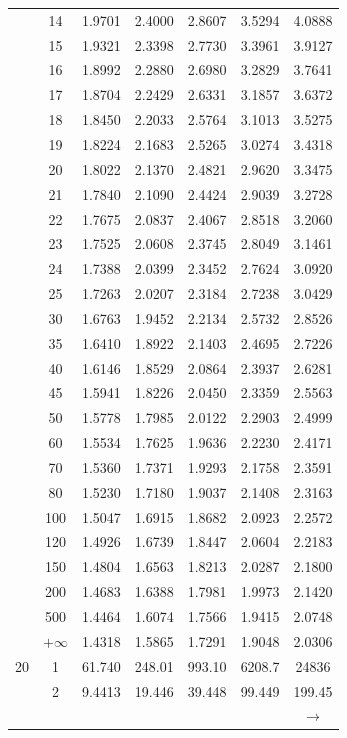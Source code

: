 \begin{minipage}{0.49\textwidth}
\begin{center}
\begin{tabular}{ccccccc}
			& 14 & 1.9701 & 2.4000 & 2.8607 & 3.5294 & 4.0888 \\
			& 15 & 1.9321 & 2.3398 & 2.7730 & 3.3961 & 3.9127 \\
			& 16 & 1.8992 & 2.2880 & 2.6980 & 3.2829 & 3.7641 \\
			& 17 & 1.8704 & 2.2429 & 2.6331 & 3.1857 & 3.6372 \\
			& 18 & 1.8450 & 2.2033 & 2.5764 & 3.1013 & 3.5275 \\
			& 19 & 1.8224 & 2.1683 & 2.5265 & 3.0274 & 3.4318 \\[5pt]
			& 20 & 1.8022 & 2.1370 & 2.4821 & 2.9620 & 3.3475 \\
			& 21 & 1.7840 & 2.1090 & 2.4424 & 2.9039 & 3.2728 \\
			& 22 & 1.7675 & 2.0837 & 2.4067 & 2.8518 & 3.2060 \\
			& 23 & 1.7525 & 2.0608 & 2.3745 & 2.8049 & 3.1461 \\
			& 24 & 1.7388 & 2.0399 & 2.3452 & 2.7624 & 3.0920 \\
			& 25 & 1.7263 & 2.0207 & 2.3184 & 2.7238 & 3.0429 \\
			& 30 & 1.6763 & 1.9452 & 2.2134 & 2.5732 & 2.8526 \\
			& 35 & 1.6410 & 1.8922 & 2.1403 & 2.4695 & 2.7226 \\
			& 40 & 1.6146 & 1.8529 & 2.0864 & 2.3937 & 2.6281 \\
			& 45 & 1.5941 & 1.8226 & 2.0450 & 2.3359 & 2.5563 \\[5pt]
			& 50 & 1.5778 & 1.7985 & 2.0122 & 2.2903 & 2.4999 \\
			& 60 & 1.5534 & 1.7625 & 1.9636 & 2.2230 & 2.4171 \\
			& 70 & 1.5360 & 1.7371 & 1.9293 & 2.1758 & 2.3591 \\
			& 80 & 1.5230 & 1.7180 & 1.9037 & 2.1408 & 2.3163 \\
			& 100 & 1.5047 & 1.6915 & 1.8682 & 2.0923 & 2.2572 \\
			& 120 & 1.4926 & 1.6739 & 1.8447 & 2.0604 & 2.2183 \\
			& 150 & 1.4804 & 1.6563 & 1.8213 & 2.0287 & 2.1800 \\
			& 200 & 1.4683 & 1.6388 & 1.7981 & 1.9973 & 2.1420 \\
			& 500 & 1.4464 & 1.6074 & 1.7566 & 1.9415 & 2.0748 \\
			& $+\infty$ & 1.4318 & 1.5865 & 1.7291 & 1.9048 & 2.0306 \\
			\midrule
			20 & 1 & 61.740 & 248.01 & 993.10 & 6208.7 & 24836 \\
			& 2 & 9.4413 & 19.446 & 39.448 & 99.449 & 199.45 \\
			&  &  &  &  &  & $\rightarrow$ \\
		\end{tabular}
	\end{center}
\end{minipage}
